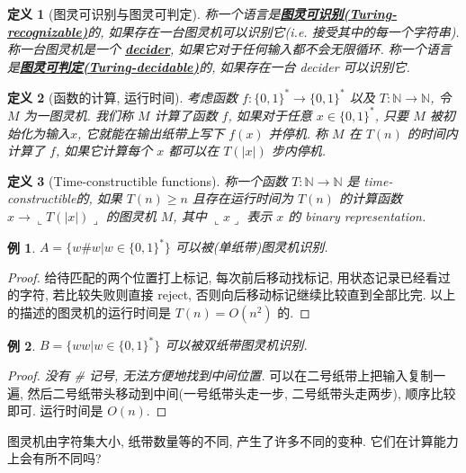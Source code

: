 \documentclass[8pt]{article}
\theoremstyle{compact}
\newtheorem{definition}{定义}[section]
\newtheorem{example}{例}[section]
\def\obj#1{\textbf{\uline{#1}}}
\def\ge{\geqslant}
\def\rep#1{\llcorner{#1}\lrcorner}
\begin{document}
\begin{definition}[图灵可识别与图灵可判定]
	称一个语言是\obj{图灵可识别(Turing-recognizable)}的, 如果存在一台图灵机可以识别它(i.e. 接受其中的每一个字符串). 称一台图灵机是一个 \obj{decider}, 如果它对于任何输入都不会无限循环. 称一个语言是\obj{图灵可判定(Turing-decidable)}的, 如果存在一台 decider 可以识别它.
\end{definition}
\begin{definition}[函数的计算, 运行时间]
	考虑函数 $f: \{0,  1\}^* \to \{0, 1\}^*$ 以及 $T: \mathbb{N} \to \mathbb{N}$, 令 $M$ 为一图灵机. 我们称 $M$ 计算了函数 $f$, 如果对于任意 $x \in \{0, 1\}^*$, 只要 $M$ 被初始化为输入$x$, 它就能在输出纸带上写下 $f(x)$ 并停机. 称 $M$ 在 $T(n)$ 的时间内计算了 $f$, 如果它计算每个 $x$ 都可以在 $T(|x|)$ 步内停机.
\end{definition}
\begin{definition}[Time-constructible functions]
	称一个函数 $T: \mathbb N \to \mathbb N$ 是 time-constructible的, 如果 $T(n) \ge n$ 且存在运行时间为 $T(n)$ 的计算函数 $x \to \rep{T(|x|)}$ 的图灵机 $M$, 其中 $\rep{x}$ 表示 $x$ 的 binary representation.
\end{definition}
\begin{example}
	$A = \{w \# w | w \in \{0, 1\}^*\}$ 可以被(单纸带)图灵机识别.
\end{example}
\begin{proof}
	给待匹配的两个位置打上标记, 每次前后移动找标记, 用状态记录已经看过的字符, 若比较失败则直接 reject, 否则向后移动标记继续比较直到全部比完. 以上的描述的图灵机的运行时间是 $T(n) = O(n^2)$ 的.
\end{proof}
\begin{example}
	$B = \{ww | w \in \{0, 1\}^*\}$ 可以被双纸带图灵机识别.
\end{example}
\begin{proof}
	\textit{没有 \# 记号, 无法方便地找到中间位置.} 可以在二号纸带上把输入复制一遍, 然后二号纸带头移动到中间(一号纸带头走一步, 二号纸带头走两步), 顺序比较即可. 运行时间是 $O(n)$.
\end{proof}

图灵机由字符集大小, 纸带数量等的不同, 产生了许多不同的变种. 它们在计算能力上会有所不同吗?
\end{document}
